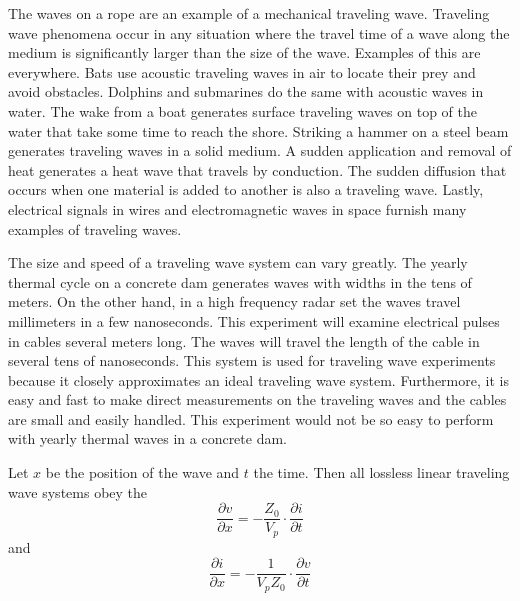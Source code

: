 \noindent The waves on a rope are an example of a mechanical traveling wave. Traveling wave phenomena occur in any situation where the travel time of a wave along the medium is significantly larger than the size of the wave. Examples of this are everywhere. Bats use acoustic traveling waves in air to locate their prey and avoid obstacles. Dolphins and submarines do the same with acoustic waves in water. The wake from a boat generates surface traveling waves on top of the water that take some time to reach the shore. Striking a hammer on a steel beam generates traveling waves in a solid medium. A sudden application and removal of heat generates a heat wave that travels by conduction. The sudden diffusion that occurs when one material is added to another is also a traveling wave. Lastly, electrical signals in wires and electromagnetic waves in space furnish many examples of traveling waves.

\noindent The size and speed of a traveling wave system can vary greatly. The yearly thermal cycle on a concrete dam generates waves with widths in the tens of meters. On the other hand, in a high frequency radar set the waves travel millimeters in a few nanoseconds. This experiment will examine electrical pulses in cables several meters long. The waves will travel the length of the cable in several tens of nanoseconds. This system is used for traveling wave experiments because it closely approximates an ideal traveling wave system. Furthermore, it is easy and fast to make direct measurements on the traveling waves and the cables are small and easily handled. This experiment would not be so easy to perform with yearly thermal waves in a concrete dam.

\noindent Let $x$ be the position of the wave and $t$ the time. Then all lossless linear traveling wave systems obey the  \begin{equation}\label{eq:TW1}
    \frac{\partial v}{\partial x} = -\frac{Z_0}{V_p}\cdot\frac{\partial i}{\partial t}
\end{equation}
and \begin{equation}\label{eq:TW2}
    \frac{\partial i}{\partial x} = -\frac{1}{V_pZ_0}\cdot\frac{\partial v}{\partial t}
\end{equation}

